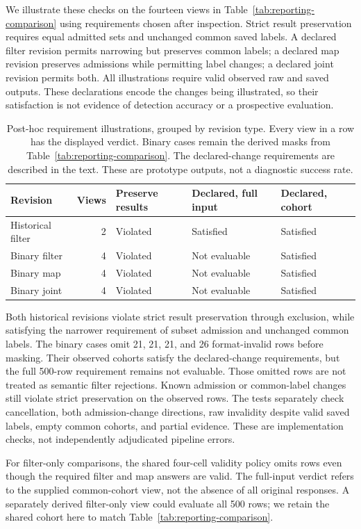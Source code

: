 \documentclass[11pt]{article}
\begin{document}
We illustrate these checks on the fourteen views in
Table~\ref{tab:reporting-comparison} using requirements chosen after
inspection. Strict result preservation requires equal admitted sets and
unchanged common saved labels. A declared filter revision permits narrowing
but preserves common labels; a declared map revision preserves admissions
while permitting label changes; a declared joint revision permits both.
All illustrations require valid observed raw and saved outputs. These
declarations encode the changes being illustrated, so their satisfaction
is not evidence of detection accuracy or a prospective evaluation.

\begin{table}[t]
\centering
\small
\caption{Post-hoc requirement illustrations, grouped by revision type.
Every view in a row has the displayed verdict. Binary cases remain the
derived masks from Table~\ref{tab:reporting-comparison}. The declared-change
requirements are described in the text. These are prototype outputs, not
a diagnostic success rate.}
\label{tab:revision-contracts}
\begin{tabular}{lrlll}
\toprule
Revision & Views & Preserve results & Declared, full input & Declared, cohort \\
\midrule
Historical filter & 2 & Violated & Satisfied & Satisfied \\
Binary filter & 4 & Violated & Not evaluable & Satisfied \\
Binary map & 4 & Violated & Not evaluable & Satisfied \\
Binary joint & 4 & Violated & Not evaluable & Satisfied \\
\bottomrule
\end{tabular}
\end{table}

Both historical revisions violate strict result preservation through
exclusion, while satisfying the narrower requirement of subset admission
and unchanged common labels. The binary cases omit 21, 21, 21, and 26
format-invalid rows before masking. Their observed cohorts satisfy the
declared-change requirements, but the full 500-row requirement remains
not evaluable. Those omitted rows are not treated as semantic filter
rejections. Known admission or common-label changes still violate strict
preservation on the observed rows. The tests separately check cancellation,
both admission-change directions, raw invalidity despite valid saved labels,
empty common cohorts, and partial evidence. These are implementation checks,
not independently adjudicated pipeline errors.

For filter-only comparisons, the shared four-cell validity policy omits
rows even though the required filter and map answers are valid. The
full-input verdict refers to the supplied common-cohort view, not the
absence of all original responses. A separately derived filter-only view
could evaluate all 500 rows; we retain the shared cohort here to match
Table~\ref{tab:reporting-comparison}.
\end{document}
